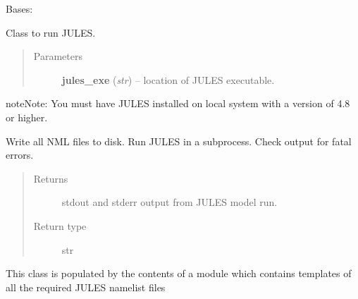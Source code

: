 \documentclass[letterpaper,10pt,english]{sphinxmanual}
\begin{document}
\begin{fulllineitems}
\label{source/sentinel_simulator.jules:sentinel_simulator.jules.py_jules.jules}
Bases: {\hyperref[source/sentinel_simulator.jules:sentinel_simulator.jules.py_jules.julesAllNML]{}}

Class to run JULES.
\begin{quote}\begin{description}
\item[{Parameters}] \leavevmode
\textbf{jules\_exe} (\emph{str}) -- location of JULES executable.

\end{description}\end{quote}

\begin{notice}{note}{Note:}
You must have JULES installed on local system with a version of 4.8 or higher.
\end{notice}

\begin{fulllineitems}
\label{source/sentinel_simulator.jules:sentinel_simulator.jules.py_jules.jules.runJules}
Write all NML files to disk.
Run JULES in a subprocess.
Check output for fatal errors.
\begin{quote}\begin{description}
\item[{Returns}] \leavevmode
stdout and stderr output from JULES model run.

\item[{Return type}] \leavevmode
str

\end{description}\end{quote}

\end{fulllineitems}


\end{fulllineitems}


\begin{fulllineitems}
\label{source/sentinel_simulator.jules:sentinel_simulator.jules.py_jules.julesAllNML}
This class is populated by the contents
of a module which contains templates
of all the required JULES namelist files

\begin{fulllineitems}
\label{source/sentinel_simulator.jules:sentinel_simulator.jules.py_jules.julesAllNML.writeNML}
\end{fulllineitems}


\end{fulllineitems}
\end{document}
